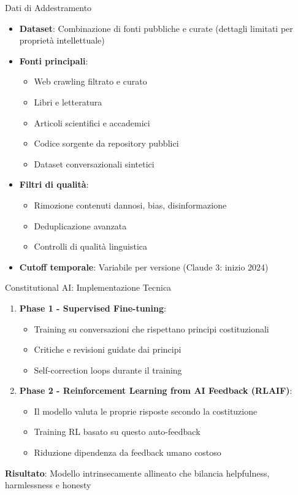 \documentclass[aspectratio=169]{beamer}
\begin{document}
\begin{frame}{Dati di Addestramento}
\begin{itemize}
    \item \textbf{Dataset}: Combinazione di fonti pubbliche e curate (dettagli limitati per proprietà intellettuale)
    \item \textbf{Fonti principali}:
    \begin{itemize}
        \item Web crawling filtrato e curato
        \item Libri e letteratura
        \item Articoli scientifici e accademici
        \item Codice sorgente da repository pubblici
        \item Dataset conversazionali sintetici
    \end{itemize}
    \item \textbf{Filtri di qualità}:
    \begin{itemize}
        \item Rimozione contenuti dannosi, bias, disinformazione
        \item Deduplicazione avanzata
        \item Controlli di qualità linguistica
    \end{itemize}
    \item \textbf{Cutoff temporale}: Variabile per versione (Claude 3: inizio 2024)
\end{itemize}
\end{frame}
%
%
\begin{frame}{Constitutional AI: Implementazione Tecnica}
\begin{enumerate}
    \item \textbf{Phase 1 - Supervised Fine-tuning}:
    \begin{itemize}
        \item Training su conversazioni che rispettano principi costituzionali
        \item Critiche e revisioni guidate dai principi
        \item Self-correction loops durante il training
    \end{itemize}
    
    \item \textbf{Phase 2 - Reinforcement Learning from AI Feedback (RLAIF)}:
    \begin{itemize}
        \item Il modello valuta le proprie risposte secondo la costituzione
        \item Training RL basato su questo auto-feedback
        \item Riduzione dipendenza da feedback umano costoso
    \end{itemize}
\end{enumerate}

\vspace{0.3cm}
\textbf{Risultato}: Modello intrinsecamente allineato che bilancia helpfulness, harmlessness e honesty
\end{frame}
\end{document}
